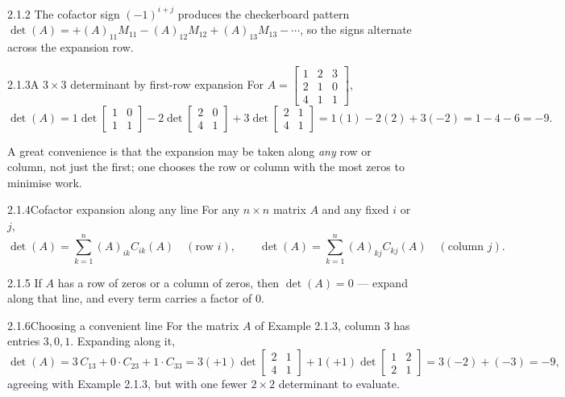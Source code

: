 \begin{rmks}{2.1.2}
The cofactor sign $(-1)^{i+j}$ produces the checkerboard pattern
$\det(A)=+(A)_{11}M_{11}-(A)_{12}M_{12}+(A)_{13}M_{13}-\cdots$, so the signs alternate across the expansion row.
\end{rmks}

\begin{exmp}{2.1.3}{A $3\times3$ determinant by first-row expansion}
For $A=\left[\begin{smallmatrix}1&2&3\\2&1&0\\4&1&1\end{smallmatrix}\right]$,
\[
\det(A)=1\!\det\!\begin{bmatrix}1&0\\1&1\end{bmatrix}-2\!\det\!\begin{bmatrix}2&0\\4&1\end{bmatrix}+3\!\det\!\begin{bmatrix}2&1\\4&1\end{bmatrix}
=1(1)-2(2)+3(-2)=1-4-6=-9.
\]
\end{exmp}

A great convenience is that the expansion may be taken along \emph{any} row or column, not just the first; one chooses the row or column with the most zeros to minimise work.

\begin{thms}{2.1.4}{Cofactor expansion along any line}
For any $n\times n$ matrix $A$ and any fixed $i$ or $j$,
\[
\det(A)=\sum_{k=1}^{n}(A)_{ik}C_{ik}(A)\quad(\text{row }i),\qquad
\det(A)=\sum_{k=1}^{n}(A)_{kj}C_{kj}(A)\quad(\text{column }j).
\]
\end{thms}

\begin{rmks}{2.1.5}
If $A$ has a row of zeros or a column of zeros, then $\det(A)=0$ --- expand along that line, and every term carries a factor of $0$.
\end{rmks}

\begin{exmp}{2.1.6}{Choosing a convenient line}
For the matrix $A$ of Example 2.1.3, column $3$ has entries $3,0,1$. Expanding along it,
\[
\det(A)=3\,C_{13}+0\cdot C_{23}+1\cdot C_{33}
=3(+1)\!\det\!\begin{bmatrix}2&1\\4&1\end{bmatrix}+1(+1)\!\det\!\begin{bmatrix}1&2\\2&1\end{bmatrix}
=3(-2)+(-3)=-9,
\]
agreeing with Example 2.1.3, but with one fewer $2\times2$ determinant to evaluate.
\end{exmp}

